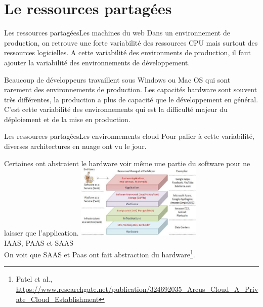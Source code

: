 \documentclass{beamer}
\begin{document}
    \section{Le ressources partagées}\label{sec:le-ressources-partagees}

    \begin{frame}{Les ressources partagées}{Les machines du web}
        Dans un environnement de production, on retrouve une forte variabilité des ressources CPU mais surtout des ressources logicielles.
        \bigbreak
        A cette variabilité des environments de production, il faut ajouter la variabilité des environnements de développement.

        Beaucoup de développeurs travaillent sous Windows ou Mac OS qui sont rarement des environnements de production.
        Les capacités hardware sont souvent très différentes, la production a plus de capacité que le développement en général.
        \bigbreak
        C'est cette variabilité des environnements qui est la difficulté majeur du déploiement et de la mise en production.
    \end{frame}

    \begin{frame}{Les ressources partagées}{Les environnements cloud}
        Pour palier à cette variabilité, diverses architectures en nuage ont vu le jour.

        Certaines ont abstraient le hardware voir même une partie du software pour ne laisser que l'application.
        \bigbreak
        \centering
        \includegraphics[width=6cm]{image/cloud-stacks} \\ IAAS, PAAS et SAAS\\
        \flushleft
        On voit que SAAS et Paas ont fait abstraction du hardware\footnote{\label{arcuscloud}Patel et al., \url{https://www.researchgate.net/publication/324692035_Arcus_Cloud_A_Private_Cloud_Establishment}}.
    \end{frame}
\end{document}
